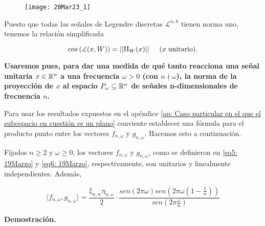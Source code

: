 
\begin{figure}[H]
	\centering
	\texttt{[image: 20Mar23\_1]} 
\end{figure}	

Puesto que todas las señales de Legendre discretas
$\mathcal{L}^{n,k}$ tienen norma uno,
tenemos la relación simplificada 

\begin{equation}
\label{eq1: 20Mar}
cos \left( \measuredangle (x, W) \right) = || \Pi_{W}(x) || 
\hspace{0.5cm} (x \hspace{0.1cm} \text{unitario).}
\end{equation}

\textbf{Usaremos pues, para dar una medida de qué tanto
reacciona una señal unitaria $x \in \mathbb{R}^{n}$ a una frecuencia
$\omega >0$ (con $n \nmid \omega$), la norma de la proyección
de $x$ al espacio $P_{\omega} \subseteq \mathbb{R}^{n}$ 
de señales n-dimensionales de frecuencia $n$.}

Para usar los
resultados expuestos en el apéndice
\ref{ap: Caso particular en el que el subespacio en cuestión es un plano}
conviente establecer una fórmula para
el producto punto entre 
los vectores $f_{n, \omega}$ y $g_{n, \omega}$.
Hacemos esto a continuación.

\begin{prop}
\label{prop: producto punto entre f y g}
Fijados $n \geq 2$ y $\omega \geq 0$, los vectores
$f_{n, \omega}$ y $g_{n, \omega}$, como se definieron
en \eqref{eq5: 19Marzo}
y \eqref{eq6: 19Marzo}, respectivamente, 
son unitarios y linealmente independientes.
Además, 

\begin{equation}
\label{eq9: 19Marzo}
\langle f_{n, \omega} , g_{n, \omega} \rangle =
\frac{\xi_{n, w} \eta_{n, \omega}}{2} \cdot 
\frac{sen(2 \pi \omega)
sen(2 \pi \omega \left( 1- \frac{1}{n} \right))}{sen \left(2 \pi 
\frac{\omega}{n} \right)}
\end{equation}

\end{prop}
\noindent
\textbf{Demostración.}


